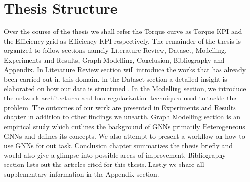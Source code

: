 \documentclass{report} %
\begin{document}
\section{Thesis Structure}\label{sec:Thesis Structure}

Over the course of the thesis we shall refer the Torque curve as Torque KPI and the Efficiency grid as Efficiency KPI respectively.
The remainder of the thesis is organized to follow sections namely Literature Review, Dataset, Modelling, Experiments and Results, Graph Modelling, Conclusion, 
Bibliography and Appendix.
In Literature Review section will introduce the works that has already been carried out in this domain. 
In the Dataset section a detailed insight is elaborated on how our data is structured .
In the Modelling section, we introduce the network architectures and loss regularization techniques used to tackle the problem.
The outcomes of our work are presented in Experiments and Results chapter in addition to other findings we unearth.
Graph Modelling section is an empirical study which outlines the background of \ac{GNN}s primarily Heterogeneous \ac{GNN}s and defines its concepts. We also attempt to 
present a workflow on how to use \ac{GNN}s for out task.
Conclusion chapter summarizes the thesis briefly and would also give a glimpse into possible areas of improvement. 
Bibliography section lists out the articles cited for this thesis. 
Lastly we share all supplementary information in the Appendix section.

\newpage 
\end{document}
